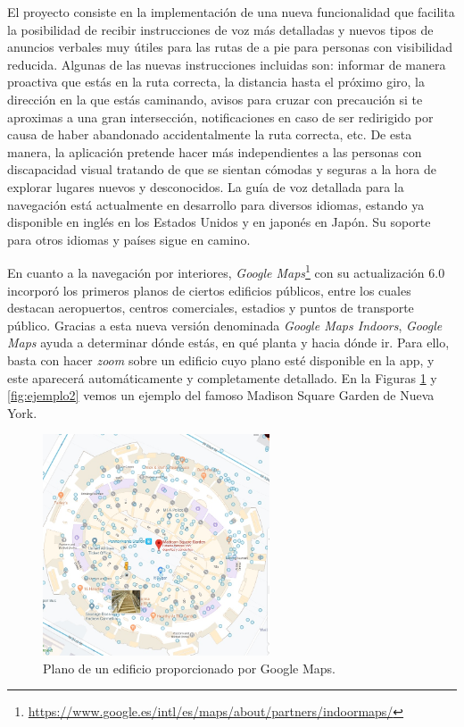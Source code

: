 El proyecto consiste en la implementación de una nueva funcionalidad que facilita la posibilidad de recibir instrucciones de voz más detalladas y nuevos tipos de anuncios verbales muy útiles para las rutas de a pie para personas con visibilidad reducida. Algunas de las nuevas instrucciones incluidas son: informar de manera proactiva que estás en la ruta correcta, la distancia hasta el próximo giro, la dirección en la que estás caminando, avisos para cruzar con precaución si te aproximas a una gran intersección, notificaciones en caso de ser redirigido por causa de haber abandonado accidentalmente la ruta correcta, etc. De esta manera, la aplicación pretende hacer más independientes a las personas con discapacidad visual tratando de que se sientan cómodas y seguras a la hora de explorar lugares nuevos y desconocidos. La guía de voz detallada para la navegación está actualmente en desarrollo para diversos idiomas, estando ya disponible en inglés en los Estados Unidos y en japonés en Japón. Su soporte para otros idiomas y países sigue en camino.

En cuanto a la navegación por interiores, \textit{Google Maps}\footnote{\url{https://www.google.es/intl/es/maps/about/partners/indoormaps/}} con su actualización $6.0$ incorporó los primeros planos de ciertos edificios públicos, entre los cuales destacan aeropuertos, centros comerciales, estadios y puntos de transporte público. Gracias a esta nueva versión denominada \textit{Google Maps Indoors}, \textit{Google Maps} ayuda a determinar dónde estás, en qué planta y hacia dónde ir. Para ello, basta con hacer \textit{zoom} sobre un edificio cuyo plano esté disponible en la app, y este aparecerá automáticamente y completamente detallado. En la Figuras \ref{fig:ejemplo} y \ref{fig:ejemplo2} vemos un ejemplo del famoso Madison Square Garden de Nueva York.


 

\begin{figure}[t]
	\centering
	\includegraphics[width=0.6\textwidth]{Imagenes/Estadodelacuestion/MadSq2}
	\caption{Plano de un edificio proporcionado por Google Maps.}
	\label{fig:ejemplo}
\end{figure}

